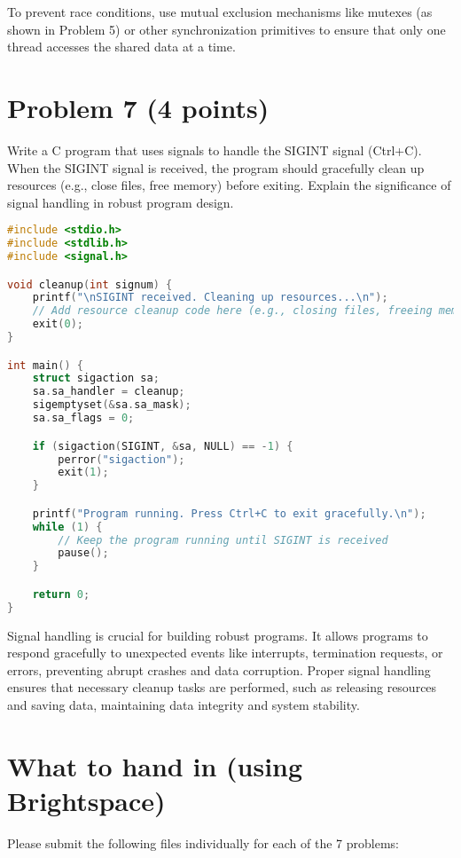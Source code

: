 \documentclass{article}
\begin{document}
To prevent race conditions, use mutual exclusion mechanisms like mutexes (as shown in Problem 5) or other synchronization primitives to ensure that only one thread accesses the shared data at a time.


\section*{Problem 7 (4 points)}

Write a C program that uses signals to handle the SIGINT signal (Ctrl+C). When the SIGINT signal is received, the program should gracefully clean up resources (e.g., close files, free memory) before exiting.  Explain the significance of signal handling in robust program design.



\begin{lstlisting}[language=C, caption=Signal Handling with SIGINT]
#include <stdio.h>
#include <stdlib.h>
#include <signal.h>

void cleanup(int signum) {
    printf("\nSIGINT received. Cleaning up resources...\n");
    // Add resource cleanup code here (e.g., closing files, freeing memory)
    exit(0);
}

int main() {
    struct sigaction sa;
    sa.sa_handler = cleanup;
    sigemptyset(&sa.sa_mask);
    sa.sa_flags = 0;

    if (sigaction(SIGINT, &sa, NULL) == -1) {
        perror("sigaction");
        exit(1);
    }

    printf("Program running. Press Ctrl+C to exit gracefully.\n");
    while (1) {
        // Keep the program running until SIGINT is received
        pause();
    }

    return 0;
}
\end{lstlisting}

Signal handling is crucial for building robust programs.  It allows programs to respond gracefully to unexpected events like interrupts, termination requests, or errors, preventing abrupt crashes and data corruption.  Proper signal handling ensures that necessary cleanup tasks are performed, such as releasing resources and saving data, maintaining data integrity and system stability.


\section*{What to hand in (using Brightspace)}

Please submit the following files individually for each of the 7 problems:
\end{document}
